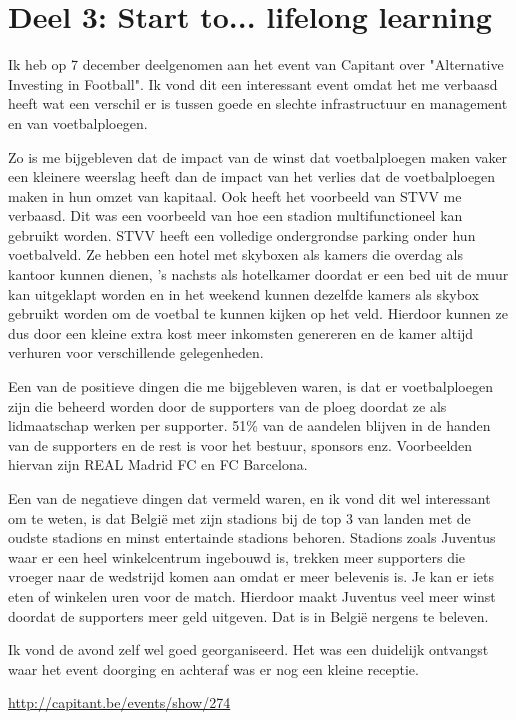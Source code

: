 \chapter{Deel 3: Start to... lifelong learning}
\label{deel3eventbijwonen}
\thispagestyle{chapternohead}

Ik heb op 7 december deelgenomen aan het event van Capitant over "Alternative Investing in Football".
Ik vond dit een interessant event omdat het me verbaasd heeft wat een verschil er is tussen goede en slechte infrastructuur en management en van voetbalploegen.

Zo is me bijgebleven dat de impact van de winst dat voetbalploegen maken vaker een kleinere weerslag heeft dan de impact van het verlies dat de voetbalploegen maken in hun omzet van kapitaal. Ook heeft het voorbeeld van STVV me verbaasd. Dit was een voorbeeld van hoe een stadion multifunctioneel kan gebruikt worden. STVV heeft een volledige ondergrondse parking onder hun voetbalveld. Ze hebben een hotel met skyboxen als kamers die overdag als kantoor kunnen dienen, 's nachsts als hotelkamer doordat er een bed uit de muur kan uitgeklapt worden en in het weekend kunnen dezelfde kamers als skybox gebruikt worden om de voetbal te kunnen kijken op het veld. Hierdoor kunnen ze dus door een kleine extra kost meer inkomsten genereren en de kamer altijd verhuren voor verschillende gelegenheden.

Een van de positieve dingen die me bijgebleven waren,  is dat er voetbalploegen zijn die beheerd worden door de supporters van de ploeg doordat ze als lidmaatschap werken per supporter. 51\% van de aandelen blijven in de handen van de supporters en de rest is voor het bestuur, sponsors enz. Voorbeelden hiervan zijn REAL Madrid FC en FC Barcelona.

Een van de negatieve dingen dat vermeld waren, en ik vond dit wel interessant om te weten, is dat België met zijn stadions bij de top 3 van landen met de oudste stadions en minst entertainde stadions behoren. Stadions zoals Juventus waar er een heel winkelcentrum ingebouwd is, trekken meer supporters die vroeger naar de wedstrijd komen aan omdat er meer belevenis is. Je kan er iets eten of winkelen uren voor de match. Hierdoor maakt Juventus veel meer winst doordat de supporters meer geld uitgeven. Dat is in België nergens te beleven.

Ik vond de avond zelf wel goed georganiseerd. Het was een duidelijk ontvangst waar het event doorging en achteraf was er nog een kleine receptie.

\url{http://capitant.be/events/show/274}



